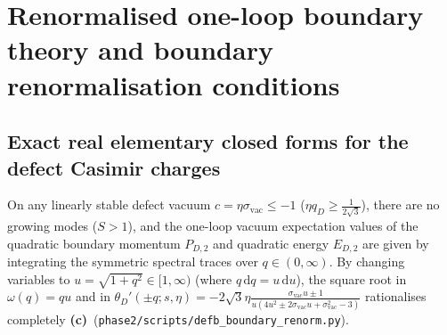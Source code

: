\documentclass[11pt,a4paper]{article}
\theoremstyle{remark}
\newcommand{\dd}{\mathrm{d}}
\newcommand{\Lc}{\textbf{(c)}}
\newcommand{\sren}{\texttt{phase2/\allowbreak scripts/\allowbreak defb\_\allowbreak boundary\_\allowbreak renorm.py}}
\begin{document}
\section{Renormalised one-loop boundary theory and boundary renormalisation conditions}
\label{sec:renorm}

\subsection{Exact real elementary closed forms for the defect Casimir charges}

On any linearly stable defect vacuum
$c = \eta\sigma_{\mathrm{vac}} \le -1$ ($\eta q_D \ge \frac{1}{2\sqrt{3}}$),
there are no growing modes ($S > 1$), and the one-loop vacuum expectation
values of the quadratic boundary momentum $P_{D,2}$ and quadratic energy
$E_{D,2}$ are given by integrating the symmetric spectral traces over
$q \in (0,\infty)$. By changing variables to $u = \sqrt{1+q^2} \in [1,\infty)$
(where $q\,\dd q = u\,\dd u$), the square root in $\omega(q) = qu$ and in
$\theta_D'(\pm q;s,\eta) = -2\sqrt{3}\eta\frac{\sigma_{\mathrm{vac}}u \pm 1}{u(4u^2 \pm 2\sigma_{\mathrm{vac}}u + \sigma_{\mathrm{vac}}^2 - 3)}$
rationalises completely \Lc\ (\sren).
\end{document}
